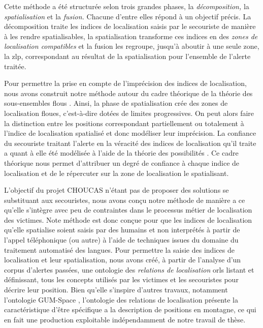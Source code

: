 Cette méthode a été structurée selon trois grandes phases, la
\emph{décomposition,} la \emph{spatialisation} et la \emph{fusion.}
Chacune d'entre elles répond à un objectif précis. La décomposition
traite les indices de localisation saisis par le secouriste de manière
à les rendre spatialisables, la spatialisation transforme ces indices
en des \emph{zones de localisation compatibles} et la fusion les
regroupe, jusqu'à aboutir à une seule zone, la \ac{zlp}, correspondant
au résultat de la spatialisation pour l'ensemble de l'alerte traitée.

Pour permettre la prise en compte de l'imprécision des indices de
localisation, nous avons construit notre méthode autour du cadre
théorique de la théorie des sous-ensembles flous
\autocite{Zadeh1965}. Ainsi, la phase de spatialisation crée des zones
de localisation floues, c'est-à-dire dotées de limites
progressives. On peut alors faire la distinction entre les positions
correspondant partiellement ou totalement à l'indice de localisation
spatialisé et donc modéliser leur imprécision.
%
La confiance du secouriste traitant l'alerte en la véracité des
indices de localisation qu'il traite a quant à elle été modélisée à
l'aide de la théorie des possibilités \autocite{Zadeh1978}. Ce cadre
théorique nous permet d'attribuer un degré de confiance à chaque
indice de localisation et de le répercuter sur la zone de localisation
le spatialisant.

L'objectif du projet CHOUCAS n'étant pas de proposer des solutions se
substituant aux secouristes, nous avons conçu notre méthode de manière
a ce qu'elle s'intègre avec peu de contraintes dans le processus
métier de localisation des victimes. Note méthode est donc conçue pour
que les indices de localisation qu'elle spatialise soient saisis par
des humains et non interprétés à partir de l'appel téléphonique (ou
autre) à l'aide de techniques issues du domaine du traitement
automatisé des langues. Pour permettre la saisie des indices de
localisation et leur spatialisation, nous avons créé, à partir de
l'analyse d'un corpus d'alertes passées, une ontologie des
\emph{relations de localisation} \acp{orl} listant et définissant,
tous les concepts utilisés par les victimes et les secouristes pour
décrire leur position. Bien qu'elle s'inspire d'autres travaux,
notamment l'ontologie GUM-Space \autocite{Bateman2010}, l'ontologie
des relations de localisation présente la caractéristique d'être
spécifique a la description de positions en montagne, ce qui en fait
une production exploitable indépendamment de notre travail de thèse.

